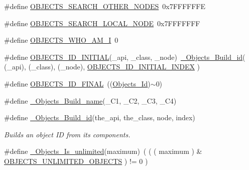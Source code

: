\begin{DoxyCompactItemize}
\#define \mbox{\hyperlink{group__RTEMSScoreObject_ga0d793311d22c1b066f3909005e49ac31}{O\+B\+J\+E\+C\+T\+S\+\_\+\+S\+E\+A\+R\+C\+H\+\_\+\+O\+T\+H\+E\+R\+\_\+\+N\+O\+D\+ES}}~0x7\+F\+F\+F\+F\+F\+FE
\item 
\#define \mbox{\hyperlink{group__RTEMSScoreObject_gaa5bb79abfd694f5145b9dc18dfc577d0}{O\+B\+J\+E\+C\+T\+S\+\_\+\+S\+E\+A\+R\+C\+H\+\_\+\+L\+O\+C\+A\+L\+\_\+\+N\+O\+DE}}~0x7\+F\+F\+F\+F\+F\+FF
\item 
\#define \mbox{\hyperlink{group__RTEMSScoreObject_ga6fd7ff36e6d951ff7cf435e9a7cdf359}{O\+B\+J\+E\+C\+T\+S\+\_\+\+W\+H\+O\+\_\+\+A\+M\+\_\+I}}~0
\item 
\#define \mbox{\hyperlink{group__RTEMSScoreObject_ga7ad5e19b6b3d77541c5c272188a71fbe}{O\+B\+J\+E\+C\+T\+S\+\_\+\+I\+D\+\_\+\+I\+N\+I\+T\+I\+AL}}(\+\_\+api,  \+\_\+class,  \+\_\+node)~\mbox{\hyperlink{group__RTEMSScoreObject_ga96bdcf529c56b52cab7504a171d26211}{\+\_\+\+Objects\+\_\+\+Build\+\_\+id}}( (\+\_\+api), (\+\_\+class), (\+\_\+node), \mbox{\hyperlink{group__RTEMSScoreObject_ga6aa91d4f58b2769c52ef2194fa6446e3}{O\+B\+J\+E\+C\+T\+S\+\_\+\+I\+D\+\_\+\+I\+N\+I\+T\+I\+A\+L\+\_\+\+I\+N\+D\+EX}} )
\item 
\#define \mbox{\hyperlink{group__RTEMSScoreObject_ga02561e994044206ad10e7fbfe6a0b0ba}{O\+B\+J\+E\+C\+T\+S\+\_\+\+I\+D\+\_\+\+F\+I\+N\+AL}}~((\mbox{\hyperlink{group__RTEMSScoreObject_ga5821f52a51072941bdd603e542d0863e}{Objects\+\_\+\+Id}})$\sim$0)
\item 
\#define \mbox{\hyperlink{group__RTEMSScoreObject_gae3e280cefdc786f588987d25c262c103}{\+\_\+\+Objects\+\_\+\+Build\+\_\+name}}(\+\_\+\+C1,  \+\_\+\+C2,  \+\_\+\+C3,  \+\_\+\+C4)
\item 
\#define \mbox{\hyperlink{group__RTEMSScoreObject_ga96bdcf529c56b52cab7504a171d26211}{\+\_\+\+Objects\+\_\+\+Build\+\_\+id}}(the\+\_\+api,  the\+\_\+class,  node,  index)
\begin{DoxyCompactList}\small\item\em Builds an object ID from its components. \end{DoxyCompactList}\item 
\#define \mbox{\hyperlink{group__RTEMSScoreObject_ga36237b938bf44d8ad1872abe5e266b9d}{\+\_\+\+Objects\+\_\+\+Is\+\_\+unlimited}}(maximum)~( ( ( maximum ) \& \mbox{\hyperlink{group__RTEMSScoreObject_ga2e39d2184f4f29e069ff679d9be47040}{O\+B\+J\+E\+C\+T\+S\+\_\+\+U\+N\+L\+I\+M\+I\+T\+E\+D\+\_\+\+O\+B\+J\+E\+C\+TS}} ) != 0 )
\item 
\mbox{\label{group__RTEMSScoreObject_gac3d3f4f27037578e8b7bdc3b80f2acdf}} 

\end{DoxyCompactItemize}
